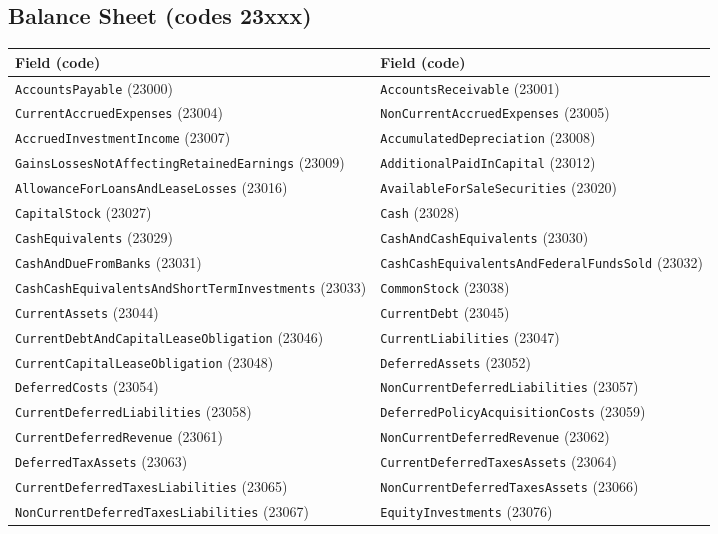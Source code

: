 \documentclass[11pt,a4paper]{report}
\begin{document}
\begin{subappendices}
\section{Balance Sheet (codes 23xxx)}
{\footnotesize
\begin{longtable}{@{}p{}p{}@{}}
\toprule \textbf{Field (code)} & \textbf{Field (code)} \\
\midrule \endhead
\texttt{AccountsPayable} (23000) & \texttt{AccountsReceivable} (23001) \\
\texttt{CurrentAccruedExpenses} (23004) & \texttt{NonCurrentAccruedExpenses} (23005) \\
\texttt{AccruedInvestmentIncome} (23007) & \texttt{AccumulatedDepreciation} (23008) \\
\texttt{GainsLossesNotAffectingRetainedEarnings} (23009) & \texttt{AdditionalPaidInCapital} (23012) \\
\texttt{AllowanceForLoansAndLeaseLosses} (23016) & \texttt{AvailableForSaleSecurities} (23020) \\
\texttt{CapitalStock} (23027) & \texttt{Cash} (23028) \\
\texttt{CashEquivalents} (23029) & \texttt{CashAndCashEquivalents} (23030) \\
\texttt{CashAndDueFromBanks} (23031) & \texttt{CashCashEquivalentsAndFederalFundsSold} (23032) \\
\texttt{CashCashEquivalentsAndShortTermInvestments} (23033) & \texttt{CommonStock} (23038) \\
\texttt{CurrentAssets} (23044) & \texttt{CurrentDebt} (23045) \\
\texttt{CurrentDebtAndCapitalLeaseObligation} (23046) & \texttt{CurrentLiabilities} (23047) \\
\texttt{CurrentCapitalLeaseObligation} (23048) & \texttt{DeferredAssets} (23052) \\
\texttt{DeferredCosts} (23054) & \texttt{NonCurrentDeferredLiabilities} (23057) \\
\texttt{CurrentDeferredLiabilities} (23058) & \texttt{DeferredPolicyAcquisitionCosts} (23059) \\
\texttt{CurrentDeferredRevenue} (23061) & \texttt{NonCurrentDeferredRevenue} (23062) \\
\texttt{DeferredTaxAssets} (23063) & \texttt{CurrentDeferredTaxesAssets} (23064) \\
\texttt{CurrentDeferredTaxesLiabilities} (23065) & \texttt{NonCurrentDeferredTaxesAssets} (23066) \\
\texttt{NonCurrentDeferredTaxesLiabilities} (23067) & \texttt{EquityInvestments} (23076) \\

\end{longtable}}
\end{subappendices}
\end{document}
